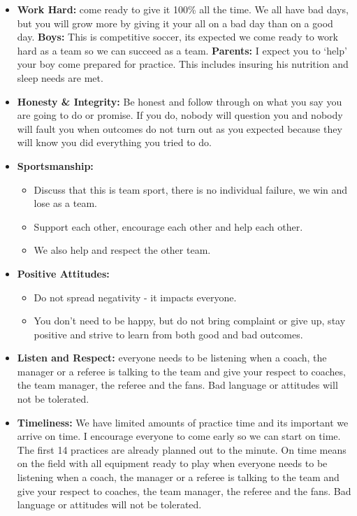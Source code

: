 \documentclass[10pt,letterpaper]{article}
\newenvironment{agendablock}[1]{%
    \tcolorbox[beamer,%
    noparskip,breakable,
    colback=LightGray,colframe=Black,%
    colbacklower=Gray!75!LightGray,%
    title=#1]}%
    {\endtcolorbox}
\begin{document}
\begin{agendablock}{Review Expectations of the Team and the Parents}
    \begin{itemize}
        \item \textbf{Work Hard:} come ready to give it 100\% all the time.  We all have bad days, but you will grow more by giving it your all on a bad day than on a good day.  \textbf{Boys:}  This is competitive soccer, its expected we come ready to work hard as a team so we can succeed as a team.
        \textbf{Parents:} I expect you to `help' your boy come prepared for practice.  This includes insuring his nutrition and sleep needs are met. 
        \item \textbf{Honesty \& Integrity:} Be honest and follow through on what you say you are going to do or promise.  If you do, nobody will question you and nobody will fault you when outcomes do not turn out as you expected because they will know you did everything you tried to do.
        \item \textbf{Sportsmanship:}
        \begin{itemize}
            \item Discuss that this is team sport, there is no individual failure, we win and lose as a team.
            \item Support each other, encourage each other and help each other.
            \item We also help and respect the other team.
        \end{itemize}
        \item \textbf{Positive Attitudes:}
        \begin{itemize}
            \item Do not spread negativity - it impacts everyone.
            \item You don't need to be happy, but do not bring complaint or give up, stay positive and strive to learn from both good and bad outcomes.
        \end{itemize}  
        \item \textbf{Listen and Respect:} everyone needs to be listening when a coach, the manager or a referee is talking to the team and give your respect to coaches, the team manager, the referee and the fans.  Bad language or attitudes will not be tolerated.
        \item \textbf{Timeliness:} We have limited amounts of practice time and its important we arrive on time.  I encourage everyone to come early so we can start on time.  The first 14 practices are already planned out to the minute.
        On time means on the field with all equipment ready to play when everyone needs to be listening when a coach, the manager or a referee is talking to the team and give your respect to coaches, the team manager, the referee and the fans.  Bad language or attitudes will not be tolerated.
    \end{itemize}
\end{agendablock}
\end{document}
